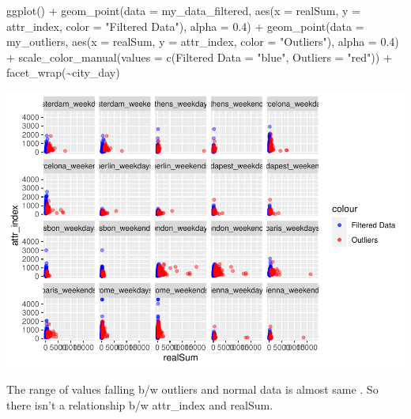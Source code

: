 \documentclass[
]{article}
\newenvironment{Shaded}{\begin{snugshade}}{\end{snugshade}}
\newcommand{\AttributeTok}[1]{\textcolor[rgb]{0.77,0.63,0.00}{#1}}
\newcommand{\FloatTok}[1]{\textcolor[rgb]{0.00,0.00,0.81}{#1}}
\newcommand{\FunctionTok}[1]{\textcolor[rgb]{0.00,0.00,0.00}{#1}}
\newcommand{\NormalTok}[1]{#1}
\newcommand{\OtherTok}[1]{\textcolor[rgb]{0.56,0.35,0.01}{#1}}
\newcommand{\SpecialCharTok}[1]{\textcolor[rgb]{0.00,0.00,0.00}{#1}}
\newcommand{\StringTok}[1]{\textcolor[rgb]{0.31,0.60,0.02}{#1}}
\begin{document}
\begin{Shaded}
\begin{Highlighting}[]
\FunctionTok{ggplot}\NormalTok{() }\SpecialCharTok{+} \FunctionTok{geom\_point}\NormalTok{(}\AttributeTok{data =}\NormalTok{ my\_data\_filtered, }\FunctionTok{aes}\NormalTok{(}\AttributeTok{x =}\NormalTok{ realSum,}
    \AttributeTok{y =}\NormalTok{ attr\_index, }\AttributeTok{color =} \StringTok{"Filtered Data"}\NormalTok{), }\AttributeTok{alpha =} \FloatTok{0.4}\NormalTok{) }\SpecialCharTok{+}
    \FunctionTok{geom\_point}\NormalTok{(}\AttributeTok{data =}\NormalTok{ my\_outliers, }\FunctionTok{aes}\NormalTok{(}\AttributeTok{x =}\NormalTok{ realSum, }\AttributeTok{y =}\NormalTok{ attr\_index,}
        \AttributeTok{color =} \StringTok{"Outliers"}\NormalTok{), }\AttributeTok{alpha =} \FloatTok{0.4}\NormalTok{) }\SpecialCharTok{+} \FunctionTok{scale\_color\_manual}\NormalTok{(}\AttributeTok{values =} \FunctionTok{c}\NormalTok{(}\StringTok{\textasciigrave{}}\AttributeTok{Filtered Data}\StringTok{\textasciigrave{}} \OtherTok{=} \StringTok{"blue"}\NormalTok{,}
    \AttributeTok{Outliers =} \StringTok{"red"}\NormalTok{)) }\SpecialCharTok{+} \FunctionTok{facet\_wrap}\NormalTok{(}\SpecialCharTok{\textasciitilde{}}\NormalTok{city\_day)}
\end{Highlighting}
\end{Shaded}

\includegraphics{Project_files/figure-latex/unnamed-chunk-17-2.pdf}

The range of values falling b/w outliers and normal data is almost same
. So there isn't a relationship b/w attr\_index and realSum.
\end{document}
